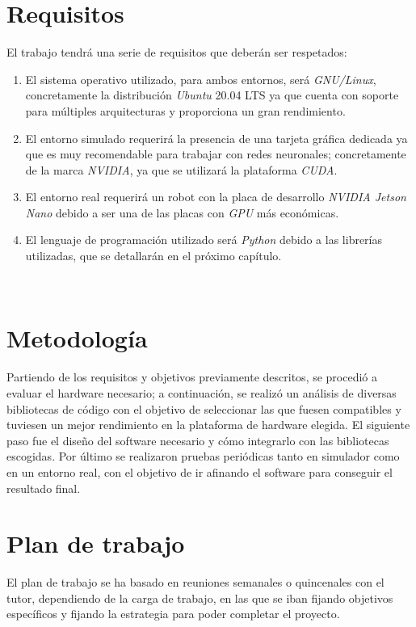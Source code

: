 \section{Requisitos}
\label{sec:requisitos}
El trabajo tendrá una serie de requisitos que deberán ser respetados:
\begin{enumerate}
	\item El sistema operativo utilizado, para ambos entornos, será \textit{GNU/Linux}, concretamente la distribución \textit{Ubuntu} 20.04 LTS ya que cuenta con soporte para múltiples arquitecturas y proporciona un gran rendimiento.
	\item El entorno simulado requerirá la presencia de una tarjeta gráfica dedicada ya que es muy recomendable para trabajar con redes neuronales; concretamente de la marca \textit{NVIDIA}, ya que se utilizará la plataforma \textit{CUDA}.
	\item El entorno real requerirá un robot con la placa de desarrollo \textit{NVIDIA Jetson Nano} debido a ser una de las placas con \textit{GPU} más económicas.
	\item El lenguaje de programación utilizado será \textit{Python} debido a las librerías utilizadas, que se detallarán en el próximo capítulo.
\end{enumerate}\

\section{Metodología}
\label{sec:metodologia}
Partiendo de los requisitos y objetivos previamente descritos, se procedió a evaluar el hardware necesario; a continuación, se realizó un análisis de diversas bibliotecas de código con el objetivo de seleccionar las que fuesen compatibles y tuviesen un mejor rendimiento en la plataforma de hardware elegida. El siguiente paso fue el diseño del software necesario y cómo integrarlo con las bibliotecas escogidas. Por último se realizaron pruebas periódicas tanto en simulador como en un entorno real, con el objetivo de ir afinando el software para conseguir el resultado final.\\

\section{Plan de trabajo}
\label{sec:plantrabajo}

El plan de trabajo se ha basado en reuniones semanales o quincenales con el tutor, dependiendo de la carga de trabajo, en las que se iban fijando objetivos específicos y fijando la estrategia para poder completar el proyecto.\\


